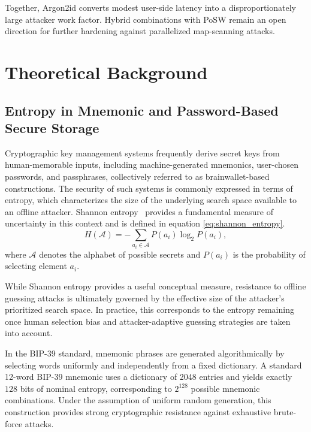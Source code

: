 \documentclass[journal,article,submit,pdftex,moreauthors]{Definitions/mdpi}
\newcommand{\add}[1]{#1}
\newcommand{\add}[1]{\added{#1}}
\begin{document}
\add{Together, Argon2id converts modest user-side latency into a disproportionately large attacker work factor. Hybrid combinations with PoSW remain an open direction for further hardening against parallelized map-scanning attacks.}

\section{Theoretical Background}

\subsection{Entropy in Mnemonic and Password-Based Secure Storage}

Cryptographic key management systems frequently derive secret keys from human-memorable inputs, including machine-generated mnemonics, user-chosen passwords, and passphrases, collectively referred to as brainwallet-based constructions. The security of such systems is commonly expressed in terms of entropy, which characterizes the size of the underlying search space available to an offline attacker. Shannon entropy~\cite{Shannon1948} provides a fundamental measure of uncertainty in this context and is defined in equation \ref{eq:shannon_entropy}.
\begin{equation}
H(\mathcal{A}) = -\sum_{a_i \in \mathcal{A}} P(a_i)\log_2 P(a_i),
\label{eq:shannon_entropy}
\end{equation}
where $\mathcal{A}$ denotes the alphabet of possible secrets and $P(a_i)$ is the probability of selecting element $a_i$.

While Shannon entropy provides a useful conceptual measure, resistance to offline guessing attacks is ultimately governed by the effective size of the attacker’s prioritized search space. In practice, this corresponds to the entropy remaining once human selection bias and attacker-adaptive guessing strategies are taken into account.

In the BIP-39 standard, mnemonic phrases are generated algorithmically by selecting words uniformly and independently from a fixed dictionary. A standard 12-word BIP-39 mnemonic uses a dictionary of 2048 entries and yields exactly \(128\) bits of nominal entropy, corresponding to \(2^{128}\) possible mnemonic combinations. Under the assumption of uniform random generation, this construction provides strong cryptographic resistance against exhaustive brute-force attacks.
\end{document}
